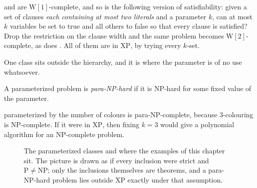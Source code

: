  and  are $\mathrm{W}[1]$-complete, and so
is the following version of satisfiability: given a set of clauses \emph{each
containing at most two literals} and a parameter $k$, can at most $k$ variables
be set to true and all others to false so that every clause is satisfied? Drop
the restriction on the clause width and the same problem becomes
$\mathrm{W}[2]$-complete, as does . All of them are in $\mathrm{XP}$, by trying every
$k$-set.

One class sits outside the hierarchy, and it is where the parameter is of no use
whatsoever.

\begin{definition}[para-NP]\label{def:para-np}
A parameterized problem is \emph{para-NP-hard} if it is \textrm{NP}-hard for
some fixed value of the parameter.
\end{definition}

\begin{example}\label{ex:para-np-coloring}
 parameterized by the number of colours is
para-NP-complete, because $3$-colouring is \textrm{NP}-complete. If it were in
$\mathrm{XP}$, then fixing $k = 3$ would give a polynomial algorithm for an
\textrm{NP}-complete problem.
\end{example}

\begin{figure}[ht]
\centering
{}
\caption{The parameterized classes and where the examples of this chapter sit.
The picture is drawn as if every inclusion were strict and $\mathrm{P} \neq
\mathrm{NP}$; only the inclusions themselves are theorems, and a para-\textrm{NP}-hard
problem lies outside $\mathrm{XP}$ exactly under that assumption.}
\label{fig:fpt-classes}
\end{figure}

